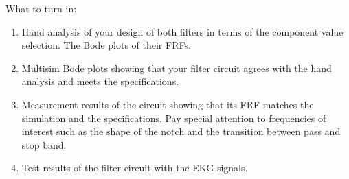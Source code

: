 What to turn in:
\begin{enumerate}
  \item Hand analysis of your design of both filters in terms of the 
    component value selection. The Bode plots of their FRFs.
  \item Multisim Bode plots showing that your filter circuit agrees 
    with the hand analysis and meets the specifications.
  \item Measurement results of the circuit showing that its FRF
    matches the simulation and the specifications. Pay special 
    attention to frequencies of interest such as the shape of the 
    notch and the transition between pass and stop band.
  \item Test results of the filter circuit with the EKG signals.
\end{enumerate}




 

 

